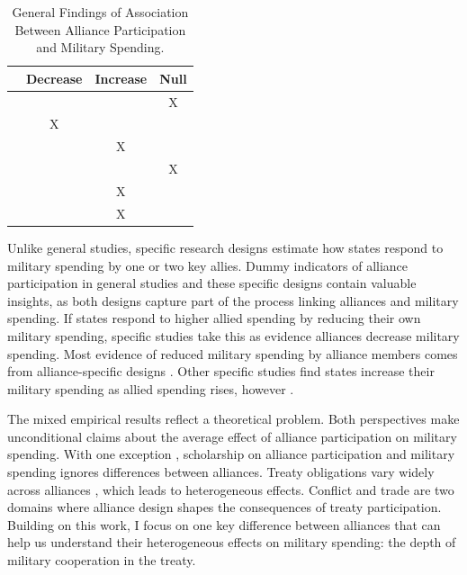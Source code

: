 \documentclass[12pt]{article}
\begin{document}
\begin{table}[hbt!]
\begin{center}
\begin{tabular}{lccc}
     & Decrease & Increase & Null \\
\hline
\citet{MostSiverson1987} &  &  & X \\
\citet{Conybeare1994} & X & &  \\
\citet{Diehl1994} &  & X &  \\
\citet{Goldsmith2003} &  &  & X \\
\citet{MorganPalmer2006} &  & X & \\ 
\citet{QuirozFlores2011} &  & X &  \\ 
\hline
\end{tabular}
\caption{General Findings of Association Between Alliance Participation and Military Spending.}
\label{tab:results-sum}
\end{center} 
\end{table}


Unlike general studies, specific research designs estimate how states respond to military spending by one or two key allies.
Dummy indicators of alliance participation in general studies and these specific designs contain valuable insights, as both designs capture part of the process linking alliances and military spending. 
If states respond to higher allied spending by reducing their own military spending, specific studies take this as evidence alliances decrease military spending. 
Most evidence of reduced military spending by alliance members comes from alliance-specific designs \citep{BarnettLevy1991, Morrow1993, Sorokin1994, PluemperNeumayer2015, GeorgeSandler2017}.
Other specific studies find states increase their military spending as allied spending rises, however \citep{ConybeareSandler1990, Chenetal1996}. 


The mixed empirical results reflect a theoretical problem. 
Both perspectives make unconditional claims about the average effect of alliance participation on military spending.  
With one exception \citep{DigiuseppePoast2016}, scholarship on alliance participation and military spending ignores differences between alliances.
Treaty obligations vary widely across alliances \citep{Leedsetal2002}, which leads to heterogeneous effects. 
Conflict \citep{Leeds2003, Benson2012} and trade \citep{Long2003, LongLeeds2006} are two domains where alliance design shapes the consequences of treaty participation. 
Building on this work, I focus on one key difference between alliances that can help us understand their heterogeneous effects on military spending: the depth of military cooperation in the treaty.
\end{document}

